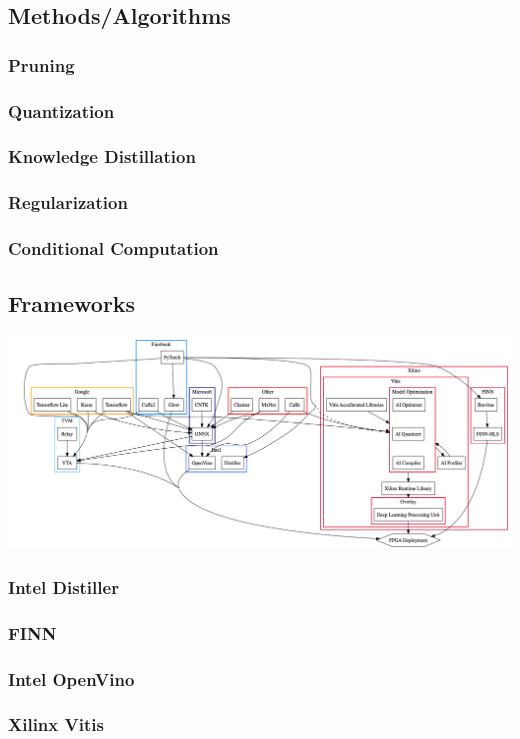 \documentclass[12pt]{article}
\begin{document}
\subsection{Methods/Algorithms}
\subsubsection{Pruning}
\subsubsection{Quantization}
\subsubsection{Knowledge Distillation}
\subsubsection{Regularization}
\subsubsection{Conditional Computation}

\subsection{Frameworks}
\includegraphics[width=\textwidth]{diagram.png}
\subsubsection{Intel Distiller}
\subsubsection{FINN}
\subsubsection{Intel OpenVino}
\subsubsection{Xilinx Vitis}
\end{document}
